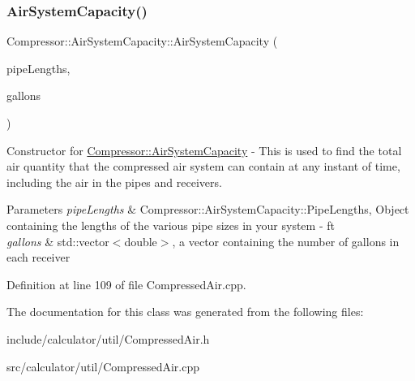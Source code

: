 \subsubsection{\texorpdfstring{Air\+System\+Capacity()}{AirSystemCapacity()}}
{\footnotesize\ttfamily Compressor\+::\+Air\+System\+Capacity\+::\+Air\+System\+Capacity (\begin{DoxyParamCaption}\item[{\hyperlink{struct_compressor_1_1_pipe_data}{Compressor\+::\+Pipe\+Data}}]{pipe\+Lengths,  }\item[{std\+::vector$<$ double $>$}]{gallons }\end{DoxyParamCaption})}

Constructor for \hyperlink{class_compressor_1_1_air_system_capacity}{Compressor\+::\+Air\+System\+Capacity} -\/ This is used to find the total air quantity that the compressed air system can contain at any instant of time, including the air in the pipes and receivers. 
\begin{DoxyParams}{Parameters}
{\em pipe\+Lengths} & Compressor\+::\+Air\+System\+Capacity\+::\+Pipe\+Lengths, Object containing the lengths of the various pipe sizes in your system -\/ ft \\
\hline
{\em gallons} & std\+::vector$<$double$>$, a vector containing the number of gallons in each receiver \\
\hline
\end{DoxyParams}


Definition at line 109 of file Compressed\+Air.\+cpp.



The documentation for this class was generated from the following files\+:\begin{DoxyCompactItemize}
\item 
include/calculator/util/Compressed\+Air.\+h\item 
src/calculator/util/Compressed\+Air.\+cpp\end{DoxyCompactItemize}
